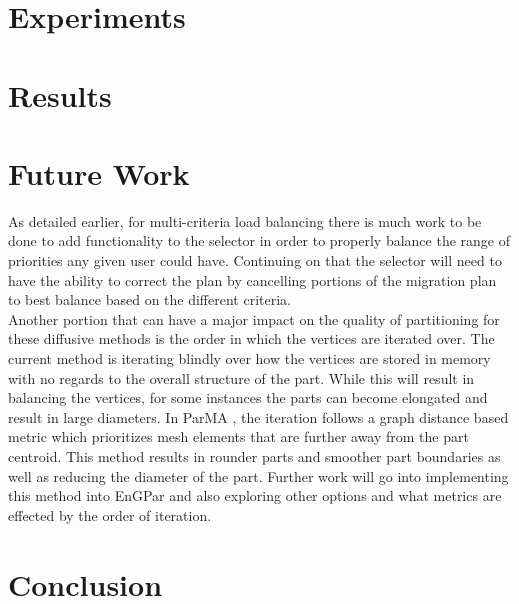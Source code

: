 \documentclass[a4paper]{article}
\begin{document}
\section{Experiments}

\section{Results}

\section{Future Work}
As detailed earlier, for multi-criteria load balancing there is much work to be done to add functionality to the selector in order to properly balance the range of priorities any given user could have. Continuing on that the selector will need to have the ability to correct the plan by cancelling portions of the migration plan to best balance based on the different criteria. \\
Another portion that can have a major impact on the quality of partitioning for these diffusive methods is the order in which the vertices are iterated over. The current method is iterating blindly over how the vertices are stored in memory with no regards to the overall structure of the part. While this will result in balancing the vertices, for some instances the parts can become elongated and result in large diameters. In ParMA \cite{SmithParma2015}, the iteration follows a graph distance based metric which prioritizes mesh elements that are further away from the part centroid. This method results in rounder parts and smoother part boundaries as well as reducing the diameter of the part. Further work will go into implementing this method into EnGPar and also exploring other options and what metrics are effected by the order of iteration.


\section{Conclusion}

\newpage 

%
%
\end{document}
